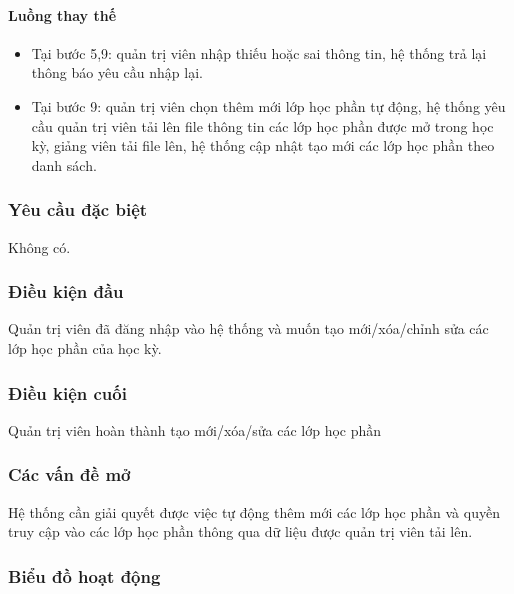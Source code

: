 \documentclass[./../main_file.tex]{subfiles}
\begin{document}
\paragraph{Luồng thay thế}
\begin{itemize}
	\item Tại bước 5,9: quản trị viên nhập thiếu hoặc sai thông tin, hệ thống trả lại thông báo yêu cầu nhập lại.
	\item Tại bước 9: quản trị viên chọn thêm mới lớp học phần tự động, hệ thống yêu cầu quản trị viên tải lên file thông tin các lớp học phần được mở trong học kỳ, giảng viên tải file lên, hệ thống cập nhật tạo mới các lớp học phần theo danh sách.
	
\end{itemize}
\subsubsection{Yêu cầu đặc biệt}
Không có.

\subsubsection{Điều kiện đầu}
Quản trị viên đã đăng nhập vào hệ thống và muốn tạo mới/xóa/chỉnh sửa các lớp học phần của học kỳ.

\subsubsection{Điều kiện cuối}
Quản trị viên hoàn thành tạo mới/xóa/sửa các lớp học phần

\subsubsection{Các vấn đề mở}
Hệ thống cần giải quyết được việc tự động thêm mới các lớp học phần và quyền truy cập vào các lớp học phần thông qua dữ liệu được quản trị viên tải lên.

\subsubsection{Biểu đồ hoạt động}


	

	
\end{document}
